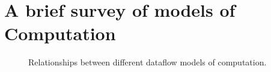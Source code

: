 \Blindtext[3]

\section{A brief survey of models of Computation}
\label{sec:mocs}

\begin{figure}[h]
	\centering
   \resizebox{0.55\textwidth}{!}{}
	\caption{Relationships between different dataflow models of computation.}
	\label{fig:dataflow_mocs}
\end{figure}
